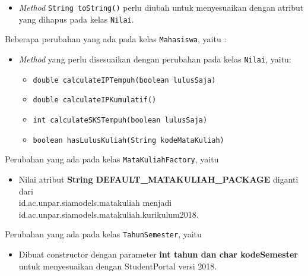 \begin{enumerate}
\begin{itemize}
		\item \textit{Method} \texttt{String toString()} perlu diubah untuk menyesuaikan dengan atribut yang dihapus pada kelas \texttt{Nilai}.
	\end{itemize}
	Beberapa perubahan yang ada pada kelas \texttt{Mahasiswa}, yaitu :
	\begin{itemize}
		\item \textit{Method} yang perlu disesuaikan dengan perubahan pada kelas \texttt{Nilai}, yaitu:
			\begin{itemize}
				\item \texttt{double calculateIPTempuh(boolean lulusSaja)}
				\item \texttt{double calculateIPKumulatif()}
				\item \texttt{int calculateSKSTempuh(boolean lulusSaja)}
				\item \texttt{boolean hasLulusKuliah(String kodeMataKuliah)}
			\end{itemize}
	\end{itemize}
	Perubahan yang ada pada kelas \texttt{MataKuliahFactory}, yaitu 
	\begin{itemize}
		\item Nilai atribut \textbf{String DEFAULT\_MATAKULIAH\_PACKAGE} diganti dari\\ id.ac.unpar.siamodels.matakuliah menjadi id.ac.unpar.siamodels.matakuliah.kurikulum2018.
	\end{itemize}
	Perubahan yang ada pada kelas \texttt{TahunSemester}, yaitu
	\begin{itemize}
		\item Dibuat constructor dengan parameter \textbf{int tahun dan char kodeSemester} untuk menyesuaikan dengan StudentPortal versi 2018.
	\end{itemize}
\end{enumerate}

